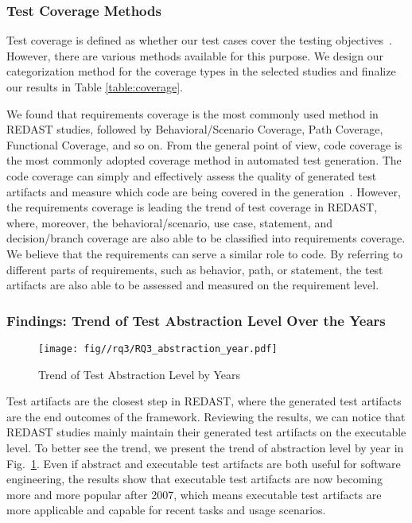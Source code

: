 \subsubsection{Test Coverage Methods}

Test coverage is defined as whether our test cases cover the testing objectives~\cite{zhu1997software}. However, there are various methods available for this purpose. We design our categorization method for the coverage types in the selected studies and finalize our results in Table \ref{table:coverage}.

We found that requirements coverage is the most commonly used method in REDAST studies, followed by Behavioral/Scenario Coverage, Path Coverage, Functional Coverage, and so on. From the general point of view, code coverage is the most commonly adopted coverage method in automated test generation. The code coverage can simply and effectively assess the quality of generated test artifacts and measure which code are being covered in the generation~\cite{code_coverage_01, code_coverage_02}. However, the requirements coverage is leading the trend of test coverage in REDAST, where, moreover, the behavioral/scenario, use case, statement, and decision/branch coverage are also able to be classified into requirements coverage. We believe that the requirements can serve a similar role to code. By referring to different parts of requirements, such as behavior, path, or statement, the test artifacts are also able to be assessed and measured on the requirement level.

\subsubsection{Findings: Trend of Test Abstraction Level Over the Years}

\begin{figure}
    \centering
    \texttt{[image: fig//rq3/RQ3\_abstraction\_year.pdf]}
    \caption{Trend of Test Abstraction Level by Years}
    \label{fig:abstraction_year}
\end{figure}

Test artifacts are the closest step in REDAST, where the generated test artifacts are the end outcomes of the framework. Reviewing the results, we can notice that REDAST studies mainly maintain their generated test artifacts on the executable level. To better see the trend, we present the trend of abstraction level by year in Fig.~\ref{fig:abstraction_year}. Even if abstract and executable test artifacts are both useful for software engineering, the results show that executable test artifacts are now becoming more and more popular after 2007, which means executable test artifacts are more applicable and capable for recent tasks and usage scenarios.

